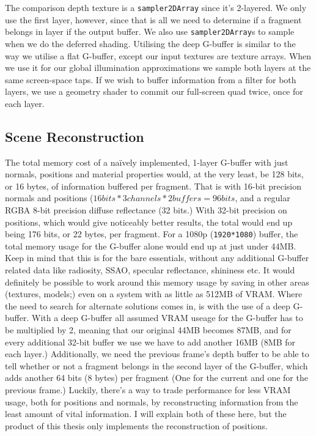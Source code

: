 The comparison depth texture is a \verb=sampler2DArray= since it's 2-layered. We only use the first layer, however, since that is all we need to determine if a fragment belongs in layer if the output buffer. We also use \verb=sampler2DArray=s to sample when we do the deferred shading. Utilising the deep G-buffer is similar to the way we utilise a flat G-buffer, except our input textures are texture arrays. When we use it for our global illumination approximations we sample both layers at the same screen-space taps. If we wish to buffer information from a filter for both layers, we use a geometry shader to commit our full-screen quad twice, once for each layer.

\subsection{Scene Reconstruction}
\label{section-reconstruction}
The total memory cost of a naïvely implemented, 1-layer G-buffer with just normals, positions and material properties would, at the very least, be 128 bits, or 16 bytes, of information buffered per fragment. That is with 16-bit precision normals and positions ($16 bits * 3 channels * 2 buffers = 96 bits$, and a regular RGBA 8-bit precision diffuse reflectance (32 bits.) With 32-bit precision on positions, which would give noticeably better results, the total would end up being 176 bits, or 22 bytes, per fragment. For a 1080p (\verb=1920*1080=) buffer, the total memory usage for the G-buffer alone would end up at just under 44MB. Keep in mind that this is for the bare essentials, without any additional G-buffer related data like radiosity, SSAO, specular reflectance, shininess etc. It would definitely be possible to work around this memory usage by saving in other areas (textures, models;) even on a system with as little as 512MB of VRAM. Where the need to search for alternate solutions comes in, is with the use of a deep G-buffer. With a deep G-buffer all assumed VRAM useage for the G-buffer has to be multiplied by 2, meaning that our original 44MB becomes 87MB, and for every additional 32-bit buffer we use we have to add another 16MB (8MB for each layer.) Additionally, we need the previous frame's depth buffer to be able to tell whether or not a fragment belongs in the second layer of the G-buffer, which adds another 64 bits (8 bytes) per fragment (One for the current and one for the previous frame.) Luckily, there's a way to trade performance for less VRAM usage, both for positions and normals, by reconstructing information from the least amount of vital information. I will explain both of these here, but the product of this thesis only implements the reconstruction of positions.

